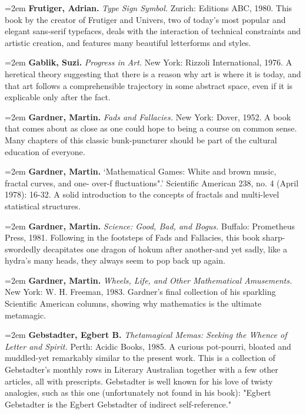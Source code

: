 \par\noindent\hangindent=2em {\bf Frutiger, Adrian.} {\it Type Sign Symbol.} Zurich: Editions ABC, 1980. This book by the creator of Frutiger and Univers, two of today's most popular and elegant sans-serif typefaces, deals with the interaction of technical constraints and artistic creation, and features many beautiful letterforms and styles.

\par\noindent\hangindent=2em {\bf Gablik, Suzi.} {\it Progress in Art.} New York: Rizzoli International, 1976. A heretical theory suggesting that there is a reason why art is where it is today, and that art follows a comprehensible trajectory in some abstract space, even if it is explicable only after the fact.

\par\noindent\hangindent=2em {\bf Gardner, Martin.} {\it Fads and Fallacies.} New York: Dover, 1952. A book that comes about as close as one could hope to being a course on common sense. Many chapters of this classic bunk-puncturer should be part of the cultural education of everyone.

\par\noindent\hangindent=2em {\bf Gardner, Martin.} `Mathematical Games: White and brown music, fractal curves, and one- over-f fluctuations".' Scientific American 238, no. 4 (April 1978): 16-32. A solid introduction to the concepts of fractals and multi-level statistical structures.

\par\noindent\hangindent=2em {\bf Gardner, Martin.} {\it Science: Good, Bad, and Bogus.} Buffalo: Prometheus Press, 1981. Following in the footsteps of Fads and Fallacies, this book sharp-swordedly decapitates one dragon of hokum after another-and yet sadly, like a hydra's many heads, they always seem to pop back up again.

\par\noindent\hangindent=2em {\bf Gardner, Martin.} {\it Wheels, Life, and Other Mathematical Amusements.} New York: W. H. Freeman, 1983. Gardner's final collection of his sparkling Scientific American columns, showing why mathematics is the ultimate metamagic.

\par\noindent\hangindent=2em {\bf Gebstadter, Egbert B.} {\it Thetamagical Memas: Seeking the Whence of Letter and Spirit.} Perth: Acidic Books, 1985. A curious pot-pourri, bloated and muddled-yet remarkably similar to the present work. This is a collection of Gebstadter's monthly rows in Literary Australian together with a few other articles, all with prescripts. Gebstadter is well known for his love of twisty analogies, such as this one (unfortunately not found in his book): "Egbert Gebstadter is the Egbert Gebstadter of indirect self-reference."

